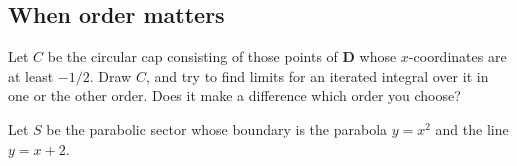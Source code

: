 \documentclass[12pt]{exam}
\theoremstyle{definition}
\begin{document}
\begin{questions}
\subsection{When order matters}

\question Let $C$ be the circular cap consisting of those points of $\mathbf{D}$ whose $x$-coordinates are at least $-1/2$. Draw $C$, and try to find limits for an iterated integral over it in one or the other order. Does it make a difference which order you choose?


\newpage

\question Let $S$ be the parabolic sector whose boundary is the parabola $y = x^2$ and the line $y = x + 2$. 


\end{questions} 
\end{document}

